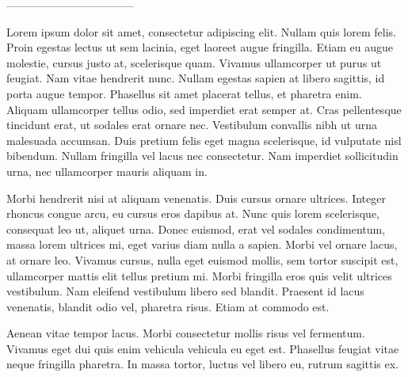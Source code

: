 \documentclass[../main.tex]{subfiles}
\begin{document}
-----------------------------------

Lorem ipsum dolor sit amet, consectetur adipiscing elit. Nullam quis lorem felis. Proin egestas lectus ut sem lacinia, eget laoreet augue fringilla. Etiam eu augue molestie, cursus justo at, scelerisque quam. Vivamus ullamcorper ut purus ut feugiat. Nam vitae hendrerit nunc. Nullam egestas sapien at libero sagittis, id porta augue tempor. Phasellus sit amet placerat tellus, et pharetra enim. Aliquam ullamcorper tellus odio, sed imperdiet erat semper at. Cras pellentesque tincidunt erat, ut sodales erat ornare nec. Vestibulum convallis nibh ut urna malesuada accumsan. Duis pretium felis eget magna scelerisque, id vulputate nisl bibendum. Nullam fringilla vel lacus nec consectetur. Nam imperdiet sollicitudin urna, nec ullamcorper mauris aliquam in.

Morbi hendrerit nisi at aliquam venenatis. Duis cursus ornare ultrices. Integer rhoncus congue arcu, eu cursus eros dapibus at. Nunc quis lorem scelerisque, consequat leo ut, aliquet urna. Donec euismod, erat vel sodales condimentum, massa lorem ultrices mi, eget varius diam nulla a sapien. Morbi vel ornare lacus, at ornare leo. Vivamus cursus, nulla eget euismod mollis, sem tortor suscipit est, ullamcorper mattis elit tellus pretium mi. Morbi fringilla eros quis velit ultrices vestibulum. Nam eleifend vestibulum libero sed blandit. Praesent id lacus venenatis, blandit odio vel, pharetra risus. Etiam at commodo est.

Aenean vitae tempor lacus. Morbi consectetur mollis risus vel fermentum. Vivamus eget dui quis enim vehicula vehicula eu eget est. Phasellus feugiat vitae neque fringilla pharetra. In massa tortor, luctus vel libero eu, rutrum sagittis ex.


\printbibliography
\end{document}
